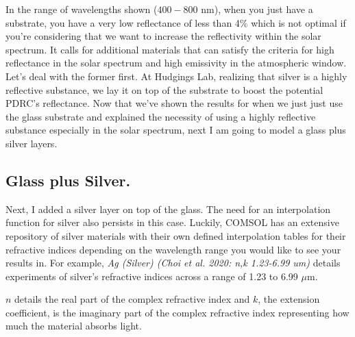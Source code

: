 

In the range of wavelengths shown ($400 - 800$ nm), when you just have a substrate, you have a very low reflectance of less than 4\% which is not optimal if you're considering that we want to increase the reflectivity within the solar spectrum. It calls for additional materials that can satisfy the criteria for high reflectance in the solar spectrum and high emissivity in the atmospheric window. Let's deal with the former first. At Hudgings Lab, realizing that silver is a highly reflective substance, we lay it on top of the substrate to boost the potential PDRC's reflectance. Now that we've shown the results for when we just just use the glass substrate and explained the necessity of using a highly reflective substance especially in the solar spectrum, next I am going to model a glass plus silver layers.

\subsection{Glass plus Silver.}
Next, I added a silver layer on top of the glass. The need for an interpolation function for silver also persists in this case. Luckily, COMSOL has an extensive repository of silver materials with their own defined interpolation tables for their refractive indices depending on the wavelength range you would like to see your results in. For example, \emph{Ag (Silver) (Choi et al. 2020: n,k 1.23-6.99 um)} details experiments of silver's refractive indices across a range of 1.23 to 6.99 $\mu$m.

$n$ details the real part of the complex refractive index and $k$, the extension coefficient, is the imaginary part of the complex refractive index representing how much the material absorbs light.



